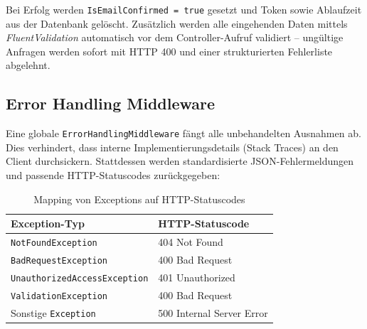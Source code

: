 Bei Erfolg werden \texttt{IsEmailConfirmed = true} gesetzt und Token sowie Ablaufzeit aus der Datenbank gelöscht. Zusätzlich werden alle eingehenden Daten mittels \textit{FluentValidation} automatisch vor dem Controller-Aufruf validiert -- ungültige Anfragen werden sofort mit HTTP 400 und einer strukturierten Fehlerliste abgelehnt.

\subsection{Error Handling Middleware}
Eine globale \texttt{ErrorHandlingMiddleware} fängt alle unbehandelten Ausnahmen ab. Dies verhindert, dass interne Implementierungsdetails (Stack Traces) an den Client durchsickern. Stattdessen werden standardisierte JSON-Fehlermeldungen und passende HTTP-Statuscodes zurückgegeben:

\begin{table}[H]
\centering
\begin{tabular}{|l|l|}
\hline
\textbf{Exception-Typ} & \textbf{HTTP-Statuscode} \\
\hline
\texttt{NotFoundException}          & 404 Not Found \\
\texttt{BadRequestException}        & 400 Bad Request \\
\texttt{UnauthorizedAccessException} & 401 Unauthorized \\
\texttt{ValidationException}        & 400 Bad Request \\
Sonstige \texttt{Exception}         & 500 Internal Server Error \\
\hline
\end{tabular}
\caption{Mapping von Exceptions auf HTTP-Statuscodes}
\label{tab:exception_mapping}
\end{table}
